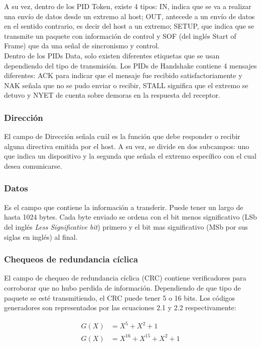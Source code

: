 		A su vez, dentro de los PID Token, existe 4 tipos: IN, indica que se va a realizar una envío de datos desde un extremo al host; OUT, antecede a un envío de datos en el sentido contrario, es decir del host a un extremo; SETUP, que indica que se transmite un paquete con información de control y SOF (del inglés {Start of Frame)} que da una señal de sincronismo y control.\\
	
		Dentro de los PIDs Data, solo existen diferentes etiquetas que se usan dependiendo del tipo de transmisión. Los PIDs de Handshake contiene 4 mensajes diferentes: ACK para indicar que el mensaje fue recibido satisfactoriamente y NAK señala que no se pudo enviar o recibir, STALL significa que el extremo se detuvo y NYET de cuenta sobre demoras en la respuesta del receptor.\\
	
	\subsubsection*{Dirección}
		El campo de Dirección señala cuál es la función que debe responder o recibir alguna directiva emitida por el host. A su vez, se divide en dos subcampos: uno que indica un dispositivo y la segunda que señala el extremo específico con el cual desea comunicarse.\\

	\subsubsection*{Datos}
		Es el campo que contiene la información a transferir. Puede tener un largo de hasta 1024 bytes. Cada byte enviado se ordena con el bit menos significativo (LSb del inglés {\it Less Significative bit}) primero y el bit mas significativo (MSb por sus siglas en inglés) al final.

	\subsubsection*{Chequeos de redundancia cíclica}
		El campo de chequeo de redundancia cíclica (CRC) contiene verificadores para corroborar que no hubo perdida de información. Dependiendo de que tipo de paquete se esté transmitiendo, el CRC puede tener 5 o 16 bits. Los códigos generadores son representados por las ecuaciones 2.1 y 2.2 respectivamente:
	
		\begin{center}
			\begin{align}
				G(X)&=X^5+X^2+1\\
				G(X)&=X^16+X^15+X^2+1
			\end{align}
		\end{center}
	
